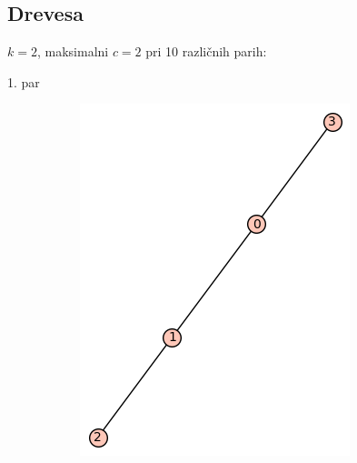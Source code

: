 \documentclass[12pt, a4paper]{article}
\begin{document}
\subsection{Drevesa}

$k=2$, maksimalni $c=2$ pri 10 različnih parih:

1. par

\begin{figure}[h!]

\begin{subfigure}{0.5\textwidth}
\includegraphics[width=\linewidth]{t-3}
\end{subfigure} \\
\begin{subfigure}{0.5\textwidth}

\end{subfigure}
\end{figure}
\end{document}

